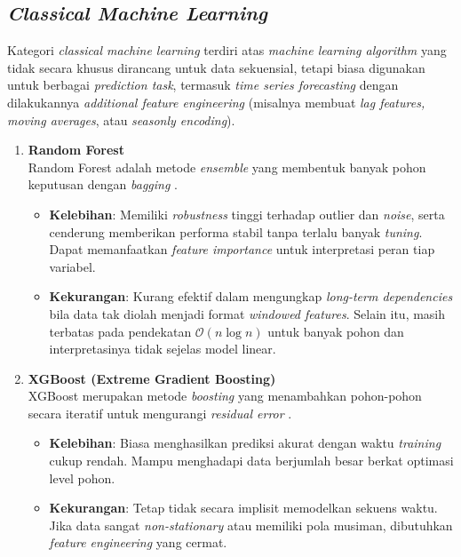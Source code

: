 \subsection{\textit{Classical Machine Learning}}
Kategori \textit{classical machine learning} terdiri atas \textit{machine learning algorithm} yang tidak secara khusus dirancang untuk data sekuensial, tetapi biasa digunakan untuk berbagai \textit{prediction task}, termasuk \textit{time series forecasting} dengan dilakukannya \textit{additional feature engineering} (misalnya membuat \textit{lag features, moving averages}, atau \textit{seasonly encoding}).

\begin{enumerate}
    \item \textbf{Random Forest} 
    \\
    Random Forest adalah metode \textit{ensemble} yang membentuk banyak pohon keputusan dengan \textit{bagging} \parencite{Breiman2001}. 
    \begin{itemize}
        \item \textbf{Kelebihan}:  
        Memiliki \textit{robustness} tinggi terhadap outlier dan \textit{noise}, serta cenderung memberikan performa stabil tanpa terlalu banyak \textit{tuning}. Dapat memanfaatkan \textit{feature importance} untuk interpretasi peran tiap variabel.
        \item \textbf{Kekurangan}:  
        Kurang efektif dalam mengungkap \textit{long-term dependencies} bila data tak diolah menjadi format \textit{windowed features}. Selain itu, masih terbatas pada pendekatan \(\mathcal{O}(n \log n)\) untuk banyak pohon dan interpretasinya tidak sejelas model linear.
    \end{itemize}

    \item \textbf{XGBoost (Extreme Gradient Boosting)} 
    \\
    XGBoost merupakan metode \textit{boosting} yang menambahkan pohon-pohon secara iteratif untuk mengurangi \textit{residual error} .
    \begin{itemize}
        \item \textbf{Kelebihan}:  
         Biasa menghasilkan prediksi akurat dengan waktu \textit{training} cukup rendah. Mampu menghadapi data berjumlah besar berkat optimasi level pohon.
        \item \textbf{Kekurangan}:  
        Tetap tidak secara implisit memodelkan sekuens waktu. Jika data sangat \textit{non-stationary} atau memiliki pola musiman, dibutuhkan \textit{feature engineering} yang cermat.  
    \end{itemize}
\end{enumerate}

